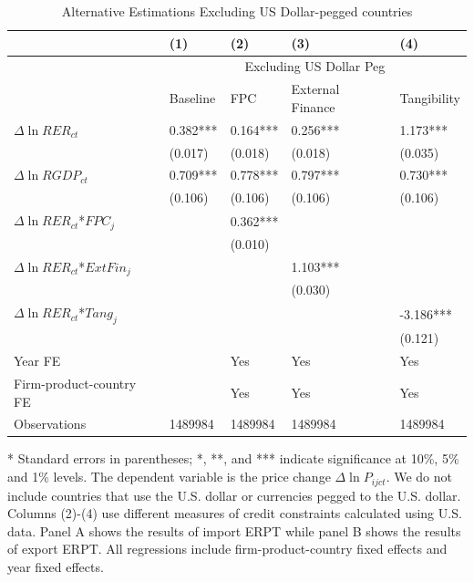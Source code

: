 \documentclass[12pt]{article}
\begin{document}
\begin{table}[htbp]
	\centering
	\caption{Alternative Estimations Excluding US Dollar-pegged countries}
	\begin{threeparttable}
	\begin{tabular}{lllll}
		\toprule
		& (1)   & (2)   & (3)   & (4) \\
		\midrule
		& \multicolumn{4}{c}{Excluding US Dollar Peg} \\
		& Baseline & FPC   & External Finance & Tangibility \\
		\midrule
		$\Delta \ln RER_{ct}$ & 0.382*** & 0.164*** & 0.256*** & 1.173*** \\
		& (0.017) & (0.018) & (0.018) & (0.035) \\
		$\Delta \ln RGDP_{ct}$ & 0.709*** & 0.778*** & 0.797*** & 0.730*** \\
		& (0.106) & (0.106) & (0.106) & (0.106) \\
		$\Delta \ln RER_{ct}$*$FPC_{j}$ &       & 0.362*** &       &  \\
		&       & (0.010) &       &  \\
		$\Delta \ln RER_{ct}$*$ExtFin_{j}$ &       &       & 1.103*** &  \\
		&       &       & (0.030) &  \\
		$\Delta \ln RER_{ct}$*$Tang_{j}$ &       &       &       & -3.186*** \\
		&       &       &       & (0.121) \\
		Year FE  &       & Yes   & Yes   & Yes \\
		Firm-product-country FE &       & Yes   & Yes   & Yes \\
		Observations & 1489984 & 1489984 & 1489984 & 1489984 \\
		\bottomrule
	\end{tabular}
	\begin{tablenotes}
		\footnotesize
		\item[*] Standard errors in parentheses; *, **, and *** indicate significance at 10\%, 5\% and 1\% levels. The dependent variable is the price change $\Delta \ln P_{ijct}$. We do not include countries that use the U.S. dollar or currencies pegged to the U.S. dollar. Columns (2)-(4) use different measures of credit constraints calculated using U.S. data. Panel A shows the results of import ERPT while panel B shows the results of export ERPT. All regressions include firm-product-country fixed effects and year fixed effects.
	\end{tablenotes}
        \end{threeparttable}
        \label{tab.alt.nopeg}
\end{table}
\end{document}
